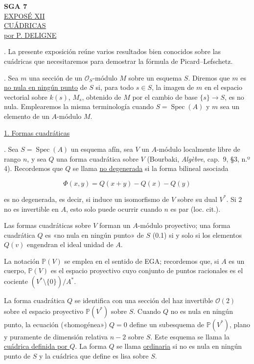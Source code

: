 
\clearpage
\pageoriginale

\begin{center}
{\large\textbf{SGA 7}}\\[1.5em]
{\Large\underline{EXPOSÉ XII}}\\[2.5em]
{\Large\underline{\underline{CUÁDRICAS}}}\\[1.5em]
{\large\underline{por P. DELIGNE}}
\end{center}

\bigskip
{}. La presente exposición reúne varios resultados bien conocidos
sobre las cuádricas que necesitaremos para demostrar la fórmula de
Picard--Lefschetz.

\medskip
{}. Sea $m$ una sección de un $\mathcal O_S$-módulo $M$ sobre
un esquema $S$. Diremos que $m$ es \underline{no nula en ningún punto} de
$S$ si, para todo $s\in S$, la imagen de $m$ en el espacio vectorial sobre
$k(s)$, $M_s$, obtenido de $M$ por el cambio de base
$\{s\}\longrightarrow S$, es no nula. Emplearemos la misma terminología
cuando $S=\operatorname{Spec}(A)$ y $m$ sea un elemento de un
$A$-módulo $M$.

\bigskip
\noindent\underline{1. Formas cuadráticas}

\medskip
{}. Sea $S=\operatorname{Spec}(A)$ un esquema afín, sea $V$ un
$A$-módulo localmente libre de rango $n$, y sea $Q$ una forma cuadrática
sobre $V$ (Bourbaki, \emph{Algèbre}, cap.~9, §3, n.º 4). Recordemos que
$Q$ se llama \underline{no degenerada} si la forma bilineal asociada

\begin{equation*}
\Phi(x,y)=Q(x+y)-Q(x)-Q(y)
\end{equation*}

es no degenerada, es decir, si induce un isomorfismo de $V$ sobre su dual
$V^*$. Si $2$ no es invertible en $A$, esto solo puede ocurrir cuando $n$
es par (loc. cit.).

\pageoriginale

Las formas cuadráticas sobre $V$ forman un $A$-módulo proyectivo; una forma
cuadrática $Q$ es «no nula en ningún punto» de $S$ (0.1) si y solo si los
elementos $Q(v)$ engendran el ideal unidad de $A$.

La notación $\mathbb P(V)$ se emplea en el sentido de EGA; recordemos que,
si $A$ es un cuerpo, $\mathbb P(V)$ es el espacio proyectivo cuyo conjunto
de puntos racionales es el cociente $(V^*\setminus\{0\})/A^*$.

La forma cuadrática $Q$ se identifica con una sección del haz invertible
$\mathcal O(2)$ sobre el espacio proyectivo $\mathbb P(V^*)$ sobre $S$.
Cuando $Q$ no es nula en ningún punto, la ecuación («homogénea») $Q=0$
define un subesquema de $\mathbb P(V^*)$, plano y puramente de dimensión
relativa $n-2$ sobre $S$. Este esquema se llama la \underline{cuádrica
definida por $Q$}. La forma $Q$ se llama \underline{ordinaria} si no es
nula en ningún punto de $S$ y la cuádrica que define es lisa sobre $S$.

